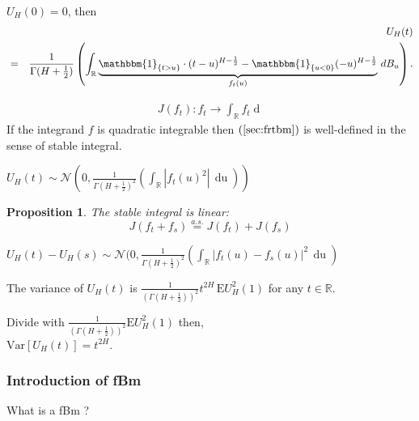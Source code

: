 \documentclass[12pt]{beamer}
\newcommand{\brkt}[1]{\left({#1} \right)}
\newtheorem{proposition}{Proposition}
\begin{document}
\begin{frame}
  \begin{theorem}
	$U_H(0) = 0$, then
	\begin{eqnarray}
	&&U_H(t) \nonumber\\
	&=& \frac{1}{\Gamma(H+\frac{1}{2})}\brkt{\int_{\mathbb{R}} \underbrace{\mathbbm{1}_{\{t > u\}}\cdot (t-u)^{H-\frac{1}{2}} - \mathbbm{1}_{\{u < 0\}} (-u)^{H-\frac{1}{2}}}_{f_t(u)} \, \mathop{dB_u}}.
	\label{sec:fbm}
  \end{eqnarray}
\end{theorem}
\begin{eqnarray*}
  J(f_t) : f_t \rightarrow \int_{\mathbb{R}} f_t \mathop{dB_u}
\end{eqnarray*}
  If the integrand $f$ is quadratic integrable then $(\ref{sec:frtbm})$ is well-defined in the sense of stable integral.
\end{frame}

\begin{frame}
  \begin{theorem}
	 $U_H(t) \sim \mathcal{N}(0, \frac{1}{\Gamma(H+\frac{1}{2})^2}(\int_{\mathbb{R}} |f_t(u)^2|\, \mathop{du}))$
  \end{theorem}

  \begin{proposition}
  The stable integral is linear:
\begin{equation*}
  J(f_t + f_s) \overset{a.s.}{=}J(f_t) + J(f_s)
\end{equation*}
\end{proposition}
  \end{frame}

\begin{frame}
 \begin{theorem}
	$U_H(t)-U_H(s) \sim \mathcal{N}(0, \frac{1}{\Gamma(H+\frac{1}{2})^2}(\int_{\mathbb{R}} |f_t(u)-f_s(u)|^2\, \mathop{du})$
  \end{theorem}
  \begin{theorem}
   The variance of $U_H(t)$ is $\frac{1}{(\Gamma(H+\frac{1}{2}))^2}t^{2H}\, \mathrm{E} U^2_H(1)$ for any $t \in \mathbb{R}$.
  \label{sec:fbmp1}
\end{theorem}
Divide with $\frac{1}{(\Gamma(H+\frac{1}{2}))^2}\mathrm{E} U^2_H(1)$ then, \\
\vspace{2ex}
\hspace{8em}$\mathrm{Var}[U_H(t)]=t^{2H}$.
\end{frame}
\frametitle{Introduction of fBm}
\begin{frame}
  What is a fBm ?
\end{frame}
\end{document}

